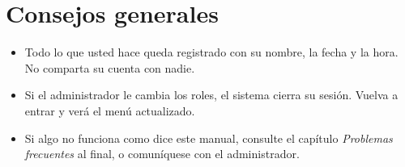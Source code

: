 \section{Consejos generales}

\begin{itemize}
  \item Todo lo que usted hace queda registrado con su nombre, la fecha y la hora. No comparta
        su cuenta con nadie.
  \item Si el administrador le cambia los roles, el sistema cierra su sesión. Vuelva a entrar
        y verá el menú actualizado.
  \item Si algo no funciona como dice este manual, consulte el capítulo
        \emph{Problemas frecuentes} al final, o comuníquese con el administrador.
\end{itemize}
